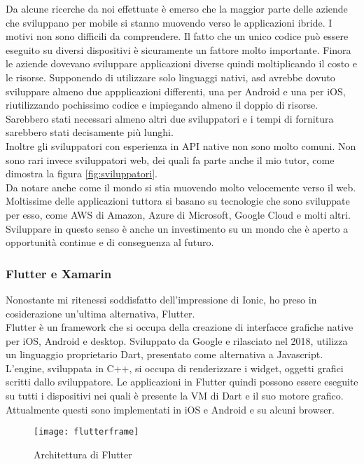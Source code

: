 Da alcune ricerche da noi effettuate è emerso che la maggior parte delle aziende che sviluppano per mobile si stanno muovendo verso le
applicazioni ibride. I motivi non sono difficili da comprendere. Il fatto che un unico codice può essere eseguito su diversi dispositivi è
sicuramente un fattore molto importante. Finora le aziende dovevano sviluppare applicazioni diverse quindi moltiplicando il costo e le
risorse. Supponendo di utilizzare solo linguaggi nativi, \acrlong{asd} avrebbe dovuto sviluppare almeno due appplicazioni differenti, una
per Android e una per iOS, riutilizzando pochissimo codice e impiegando almeno il doppio di risorse. Sarebbero stati necessari almeno altri
due sviluppatori e i tempi di fornitura sarebbero stati decisamente più lunghi. \\
Inoltre gli sviluppatori con esperienza in API native non sono molto comuni. Non sono rari invece sviluppatori web, dei quali fa parte anche il mio
tutor, come dimostra la figura \autoref{fig:sviluppatori}. \\
Da notare anche come il mondo si stia muovendo molto velocemente verso il web. Moltissime delle applicazioni tuttora si basano su tecnologie
che sono sviluppate per esso, come AWS di Amazon, Azure di Microsoft, Google Cloud e molti altri. Sviluppare in questo senso è
anche un investimento su un mondo che è aperto a opportunità continue e di conseguenza al futuro.

\subsubsection{Flutter e Xamarin}
Nonostante mi ritenessi soddisfatto dell'impressione di Ionic, ho preso in cosiderazione un'ultima alternativa, Flutter. \\
Flutter è un framework che si occupa della creazione di interfacce grafiche native per iOS, Android e desktop. Sviluppato da Google e
rilasciato nel 2018, utilizza un linguaggio proprietario Dart, presentato come alternativa a Javascript. L'engine, sviluppata in
\gls{C++}, si occupa di renderizzare i widget, oggetti grafici scritti dallo sviluppatore. Le applicazioni in Flutter quindi possono essere
eseguite su tutti i dispositivi nei quali è presente la VM di Dart e il suo motore grafico. Attualmente questi sono implementati in iOS e
Android e su alcuni browser. \\

\begin{figure}[h]
  \texttt{[image: flutterframe]} 
  \caption{Architettura di Flutter}
  \label{fig:flutter}
\end{figure}

